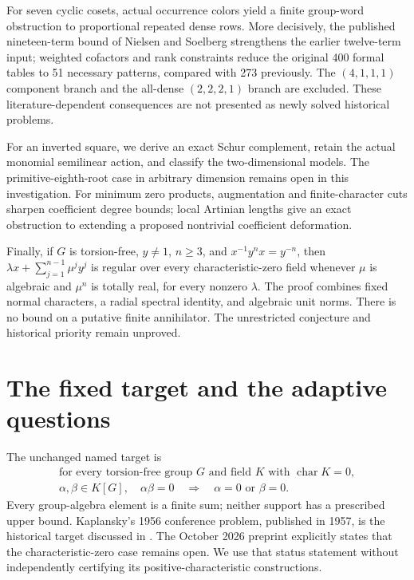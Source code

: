 \documentclass[11pt,a4paper,oneside]{report}
\theoremstyle{definition}
\theoremstyle{remark}
\begin{document}
For seven cyclic cosets, actual occurrence colors yield a finite
group-word obstruction to proportional repeated dense rows. More
decisively, the published nineteen-term bound of Nielsen and
Soelberg strengthens the earlier twelve-term input; weighted
cofactors and rank constraints reduce the original 400 formal
tables to 51 necessary patterns, compared with 273 previously.
The $(4,1,1,1)$ component branch and the all-dense $(2,2,2,1)$
branch are excluded. These literature-dependent consequences
are not presented as newly solved historical problems.

For an inverted square, we derive an exact Schur complement,
retain the actual monomial semilinear action, and classify the
two-dimensional models. The primitive-eighth-root case in arbitrary
dimension remains open in this investigation. For minimum zero
products, augmentation and finite-character cuts sharpen coefficient
degree bounds; local Artinian lengths give an exact obstruction to
extending a proposed nontrivial coefficient deformation.

Finally, if $G$ is torsion-free, $y\ne1$, $n\ge3$, and
$x^{-1}y^n x=y^{-n}$, then
$\lambda x+\sum_{j=1}^{n-1}\mu^j y^j$ is regular over every
characteristic-zero field whenever $\mu$ is algebraic and $\mu^n$
is totally real, for every nonzero $\lambda$. The proof combines
fixed normal characters, a radial spectral identity, and algebraic
unit norms. There is no bound on a putative finite annihilator.
The unrestricted conjecture and historical priority remain unproved.
\medskip
\section{The fixed target and the adaptive questions}

The unchanged named target is
\begin{equation}\label{M13:eq:target}
\begin{gathered}
 \text{for every torsion-free group }G\text{ and field }K
 \text{ with }\operatorname{char}K=0,\\
 \alpha,\beta\in K[G],\quad \alpha\beta=0
 \quad\Longrightarrow\quad \alpha=0\text{ or }\beta=0.
\end{gathered}
\end{equation}
Every group-algebra element is a finite sum; neither support has a
prescribed upper bound. Kaplansky's 1956 conference problem, published
in 1957, is the historical target discussed in \cite{B:NS,B:ATsmall}.
The October 2026 preprint \cite{B:Ivanov} explicitly states that the
characteristic-zero case remains open. We use that status statement
without independently certifying its positive-characteristic
constructions.
\end{document}
